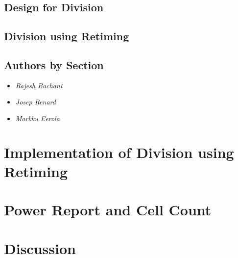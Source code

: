 \documentclass[11pt,a4paper]{article}
\begin{document}
\subsection{Design for Division}
\subsection{Division using Retiming}
\subsection{Authors by Section}
\begin{itemize}
\item \textit{Rajesh Bachani} 
\item \textit{Josep Renard} 
\item \textit{Markku Eerola} 
\end{itemize}

\section{Implementation of Division using Retiming}
\label{section:impl}
\section{Power Report and Cell Count}
\label{section:power}
\section{Discussion}
\label{section:discussion}
\end{document}
